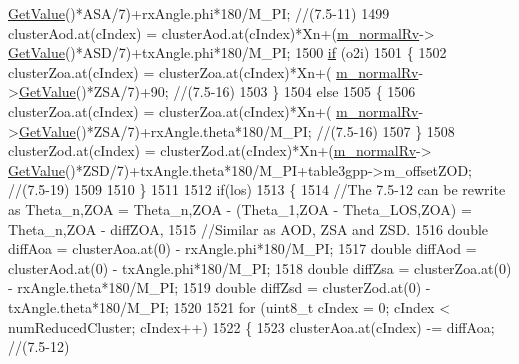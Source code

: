 \begin{DoxyCode}
      \hyperlink{classns3_1_1NormalRandomVariable_a0134d131477bc439cc6ff7cbe84b03a9}{GetValue}()*ASA/7)+rxAngle.phi*180/M\_PI; \textcolor{comment}{//(7.5-11)}
1499                 clusterAod.at(cIndex) = clusterAod.at(cIndex)*Xn+(\hyperlink{classns3_1_1MmWave3gppChannel_ac2e02ebacc72ed96518d785f2dc87c57}{m\_normalRv}->
      \hyperlink{classns3_1_1NormalRandomVariable_a0134d131477bc439cc6ff7cbe84b03a9}{GetValue}()*ASD/7)+txAngle.phi*180/M\_PI;
1500                 \hyperlink{loss__ITU1238_8m_a419d895abe1313c35fa353c93802647e}{if} (o2i)
1501                 \{
1502                         clusterZoa.at(cIndex) = clusterZoa.at(cIndex)*Xn+(
      \hyperlink{classns3_1_1MmWave3gppChannel_ac2e02ebacc72ed96518d785f2dc87c57}{m\_normalRv}->\hyperlink{classns3_1_1NormalRandomVariable_a0134d131477bc439cc6ff7cbe84b03a9}{GetValue}()*ZSA/7)+90; \textcolor{comment}{//(7.5-16)}
1503                 \}
1504                 \textcolor{keywordflow}{else}
1505                 \{
1506                         clusterZoa.at(cIndex) = clusterZoa.at(cIndex)*Xn+(
      \hyperlink{classns3_1_1MmWave3gppChannel_ac2e02ebacc72ed96518d785f2dc87c57}{m\_normalRv}->\hyperlink{classns3_1_1NormalRandomVariable_a0134d131477bc439cc6ff7cbe84b03a9}{GetValue}()*ZSA/7)+rxAngle.theta*180/M\_PI; \textcolor{comment}{//(7.5-16)}
1507                 \}
1508                 clusterZod.at(cIndex) = clusterZod.at(cIndex)*Xn+(\hyperlink{classns3_1_1MmWave3gppChannel_ac2e02ebacc72ed96518d785f2dc87c57}{m\_normalRv}->
      \hyperlink{classns3_1_1NormalRandomVariable_a0134d131477bc439cc6ff7cbe84b03a9}{GetValue}()*ZSD/7)+txAngle.theta*180/M\_PI+table3gpp->m\_offsetZOD; \textcolor{comment}{//(7.5-19)}
1509 
1510         \}
1511 
1512         \textcolor{keywordflow}{if}(los)
1513         \{
1514                 \textcolor{comment}{//The 7.5-12 can be rewrite as Theta\_n,ZOA = Theta\_n,ZOA - (Theta\_1,ZOA - Theta\_LOS,ZOA) =
       Theta\_n,ZOA - diffZOA,}
1515                 \textcolor{comment}{//Similar as AOD, ZSA and ZSD.}
1516                 \textcolor{keywordtype}{double} diffAoa = clusterAoa.at(0) - rxAngle.phi*180/M\_PI;
1517                 \textcolor{keywordtype}{double} diffAod = clusterAod.at(0) - txAngle.phi*180/M\_PI;
1518                 \textcolor{keywordtype}{double} diffZsa = clusterZoa.at(0) - rxAngle.theta*180/M\_PI;
1519                 \textcolor{keywordtype}{double} diffZsd = clusterZod.at(0) - txAngle.theta*180/M\_PI;
1520 
1521                 \textcolor{keywordflow}{for} (uint8\_t cIndex = 0; cIndex < numReducedCluster; cIndex++)
1522                 \{
1523                         clusterAoa.at(cIndex) -= diffAoa; \textcolor{comment}{//(7.5-12)}

\end{DoxyCode}
